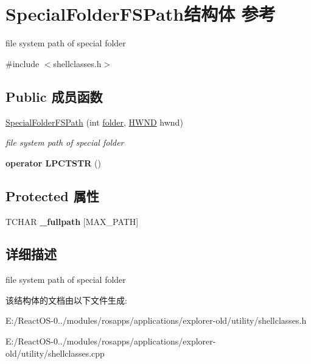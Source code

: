 \hypertarget{struct_special_folder_f_s_path}{}\section{Special\+Folder\+F\+S\+Path结构体 参考}
\label{struct_special_folder_f_s_path}


file system path of special folder  




{\ttfamily \#include $<$shellclasses.\+h$>$}

\subsection*{Public 成员函数}
\begin{DoxyCompactItemize}
\item 
\mbox{\label{struct_special_folder_f_s_path_a1e54f3dd110b253b4f5050a1c9924f7c}} 
\hyperlink{struct_special_folder_f_s_path_a1e54f3dd110b253b4f5050a1c9924f7c}{Special\+Folder\+F\+S\+Path} (int \hyperlink{structfolder}{folder}, \hyperlink{interfacevoid}{H\+W\+ND} hwnd)
\begin{DoxyCompactList}\small\item\em file system path of special folder \end{DoxyCompactList}\item 
\mbox{\label{struct_special_folder_f_s_path_a1fa9652da38615103bbe53d92cc4a3d8}} 
{\bfseries operator L\+P\+C\+T\+S\+TR} ()
\end{DoxyCompactItemize}
\subsection*{Protected 属性}
\begin{DoxyCompactItemize}
\item 
\mbox{\label{struct_special_folder_f_s_path_a9b3afc1c0ed638a8d42c44e0c6278d3b}} 
T\+C\+H\+AR {\bfseries \+\_\+fullpath} \mbox{[}M\+A\+X\+\_\+\+P\+A\+TH\mbox{]}
\end{DoxyCompactItemize}


\subsection{详细描述}
file system path of special folder 

该结构体的文档由以下文件生成\+:\begin{DoxyCompactItemize}
\item 
E\+:/\+React\+O\+S-\/0../modules/rosapps/applications/explorer-\/old/utility/shellclasses.\+h\item 
E\+:/\+React\+O\+S-\/0../modules/rosapps/applications/explorer-\/old/utility/shellclasses.\+cpp\end{DoxyCompactItemize}

